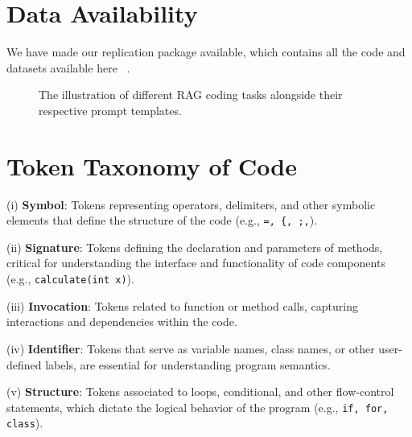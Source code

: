 \section{Data Availability}
We have made our replication package available, which contains all the code and datasets available here ~\citep {reproduce}.




\begin{figure}
    \caption{The illustration of different RAG coding tasks alongside their respective prompt templates.}
    \vspace{-0.3cm}
\end{figure}\label{fig:template}

\section{Token Taxonomy of Code}\label{sec:category}
(i) \textbf{Symbol}: Tokens representing operators, delimiters, and other symbolic elements that define the structure of the code (e.g., {\tt =, \{, ;,}). 
    
\noindent(ii) \textbf{Signature}: Tokens defining the declaration and parameters of methods, critical for understanding the interface and functionality of code components (e.g., {\tt calculate(int x)}).
    
\noindent(iii) \textbf{Invocation}: Tokens related to function or method calls, capturing interactions and dependencies within the code.
    
\noindent(iv) \textbf{Identifier}: Tokens that serve as variable names, class names, or other user-defined labels, are essential for understanding program semantics.

\noindent(v) \textbf{Structure}:  Tokens associated to loops, conditional, and other flow-control statements, which dictate the logical behavior of the program (e.g., {\tt if, for, class}). 


